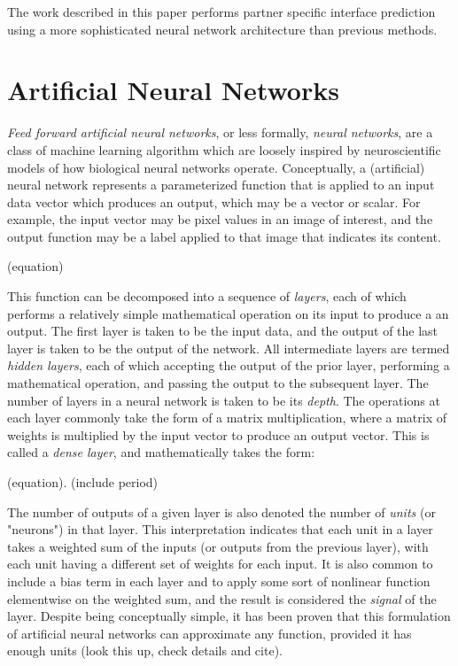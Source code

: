 

The work described in this paper performs partner specific interface prediction using a more sophisticated neural network architecture than previous methods. 


\section{Artificial Neural Networks}

\textit{Feed forward artificial neural networks}, or less formally, \textit{neural networks}, are a class of machine learning algorithm which are loosely inspired by neuroscientific models of how biological neural networks operate. 
Conceptually, a (artificial) neural network represents a parameterized function that is applied to an input data vector which produces an output, which may be a vector or scalar. 
For example, the input vector may be pixel values in an image of interest, and the output function may be a label applied to that image that indicates its content.

(equation)

This function can be decomposed into a sequence of \textit{layers}, each of which performs a relatively simple mathematical operation on its input to produce a an output.
The first layer is taken to be the input data, and the output of the last layer is taken to be the output of the network. 
All intermediate layers are termed \textit{hidden layers}, each of which accepting the output of the prior layer, performing a mathematical operation, and passing the output to the subsequent layer.
The number of layers in a neural network is taken to be its \textit{depth}.
The operations at each layer commonly take the form of a matrix multiplication, where a matrix of weights is multiplied by the input vector to produce an output vector.
This is called a \textit{dense layer}, and mathematically takes the form:

(equation). (include period)

The number of outputs of a given layer is also denoted the number of \textit{units} (or "neurons") in that layer.
This interpretation indicates that each unit in a layer takes a weighted sum of the inputs (or outputs from the previous layer), with each unit having a different set of weights for each input. 
It is also common to include a bias term in each layer and to apply some sort of nonlinear function elementwise on the weighted sum, and the result is considered the \textit{signal} of the layer.
Despite being conceptually simple, it has been proven that this formulation of artificial neural networks can approximate any function, provided it has enough units (look this up, check details and cite).

